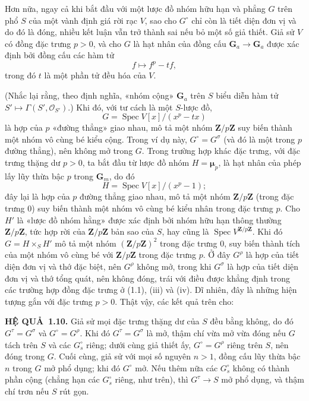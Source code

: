 \documentclass[11pt,twoside,openany]{book}
\numberwithin{equation}{section}
\newcommand{\src}[1]{%
  \phantomsection\hypertarget{src:\fgasourceid:#1}{}%
  \marginpar{\raggedleft\footnotesize\sffamily #1}%
}
\newcommand{\fgasourceid}{unset}
\newcommand{\result}[2]{\par\medskip\noindent\textbf{#1\if\relax\detokenize{#2}\relax\else\ #2\fi.}\quad}
\begin{document}
Hơn nữa, ngay cả khi bắt đầu với một lược đồ nhóm hữu hạn và phẳng $G$ trên
phổ $S$ của một vành định giá rời rạc $V$, sao cho $G^\circ$ chỉ còn là tiết
diện đơn vị và do đó là đóng, nhiều kết luận vẫn trở thành sai nếu bỏ một số
giả thiết. Giả sử $V$ có đồng đặc trưng $p>0$, và cho $G$ là hạt nhân của đồng
cấu
$\mathbf G_a\longrightarrow\mathbf G_a$ được xác định bởi đồng cấu các hàm tử
\[
f\longmapsto f^p-tf,
\]
trong đó $t$ là một phần tử đều hóa của $V$.
\src{230}
(Nhắc lại rằng, theo định nghĩa, «nhóm cộng» $\mathbf G_a$ trên $S$ biểu diễn
hàm tử $S'\longmapsto\Gamma(S',\mathcal O_{S'})$.) Khi đó, với tư cách là một
$S$-lược đồ,
\[
G=\operatorname{Spec}V[x]/(x^p-tx)
\]
là hợp của $p$ «đường thẳng» giao nhau, mô tả một nhóm
$\mathbf Z/p\mathbf Z$ suy biến thành một nhóm vô cùng bé kiểu cộng. Trong ví
dụ này, $G^\circ=G^\sigma$ (và đó là một trong $p$ đường thẳng), nên không mở
trong $G$. Trong trường hợp khác đặc trưng, với đặc trưng thặng dư $p>0$, ta
bắt đầu từ lược đồ nhóm $H=\symbf{\mu}_p$, là hạt nhân của phép lấy lũy thừa
bậc $p$ trong $\mathbf G_m$, do đó
\[
H=\operatorname{Spec}V[x]/(x^p-1) ;
\]
đây lại là hợp của $p$ đường thẳng giao nhau, mô tả một nhóm
$\mathbf Z/p\mathbf Z$ (trong đặc trưng 0) suy biến thành một nhóm vô cùng bé
kiểu nhân trong đặc trưng $p$. Cho $H'$ là «lược đồ nhóm hằng» được xác định
bởi nhóm hữu hạn thông thường $\mathbf Z/p\mathbf Z$, tức hợp rời của
$\mathbf Z/p\mathbf Z$ bản sao của $S$, hay cũng là
$\operatorname{Spec}V^{\mathbf Z/p\mathbf Z}$. Khi đó $G=H\times_S H'$ mô tả
một nhóm $(\mathbf Z/p\mathbf Z)^2$ trong đặc trưng 0, suy biến thành tích của
một nhóm vô cùng bé với $\mathbf Z/p\mathbf Z$ trong đặc trưng $p$. Ở đây
$G^\rho$ là hợp của tiết diện đơn vị và thớ đặc biệt, nên $G^\rho$ không mở,
trong khi $G^\sigma$ là hợp của tiết diện đơn vị và thớ tổng quát, nên không
đóng, trái với điều được khẳng định trong các trường hợp đồng đặc trưng ở
(1.1), (iii) và (iv). Dĩ nhiên, đây là những hiện tượng gắn với đặc trưng
$p>0$. Thật vậy, các kết quả trên cho:

\result{HỆ QUẢ}{1.10} Giả sử mọi đặc trưng thặng dư của $S$ đều bằng không,
do đó $G^\tau=G^\sigma$ và $G^\circ=G^\rho$. Khi đó $G^\tau=G^\sigma$ là mở,
thậm chí vừa mở vừa đóng nếu $G$ tách trên $S$ và các $G_s^\circ$ riêng; dưới
cùng giả thiết ấy, $G^\circ=G^\rho$ riêng trên $S$, nên đóng trong $G$. Cuối
cùng, giả sử với mọi số nguyên $n>1$, đồng cấu lũy thừa bậc $n$ trong $G$ mở
phổ dụng; khi đó $G^\circ$ mở. Nếu thêm nữa các $G_s^\circ$ không có thành
phần cộng (chẳng hạn các $G_s^\circ$ riêng, như trên), thì
$G^\tau\longrightarrow S$ mở phổ dụng, và thậm chí trơn nếu $S$ rút gọn.
\end{document}
